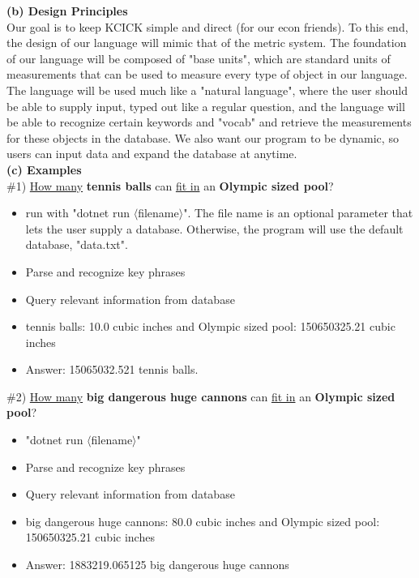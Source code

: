 \documentclass{article}
\begin{document}
{\large{\textbf{(b) Design Principles }}}\\

Our goal is to keep KCICK simple and direct {\footnotesize(for our econ friends)}. To this end, the design of our language will mimic that of the metric system. The foundation of our language will be composed of "base units", which are standard units of measurements that can be used to measure every type of object in our language. The language will be used much like a "natural language", where the user should be able to supply input, typed out like a regular question, and the language will be able to recognize certain keywords and "vocab" and retrieve the measurements for these objects in the database. We also want our program to be dynamic, so users can input data and expand the database at anytime.\\

{\large{\textbf{(c) Examples }}}  \\

\#1) \underline{How many}  \textbf{tennis balls} can \underline{fit in} an \textbf{Olympic sized pool}? 
\begin{itemize}
    \item run with "dotnet run $\langle$filename$\rangle$". The file name is an optional parameter that lets the user supply a database. Otherwise, the program will use the default database, "data.txt".
    \item Parse and recognize key phrases
    \item Query relevant information from database 
    \item tennis balls: 10.0 cubic inches and Olympic sized pool: 150650325.21 cubic inches
    \item Answer: 15065032.521 tennis balls.
\end{itemize}

             
\#2) \underline{How many} \textbf{big dangerous huge cannons} can \underline{fit in} an \textbf{Olympic sized pool}? 
\begin{itemize}
    \item "dotnet run $\langle$filename$\rangle$"
    \item Parse and recognize key phrases
    \item Query relevant information from database 
    \item big dangerous huge cannons: 80.0 cubic inches and Olympic sized pool: 150650325.21 cubic inches
    \item Answer: 1883219.065125 big dangerous huge cannons
\end{itemize}
\end{document}
